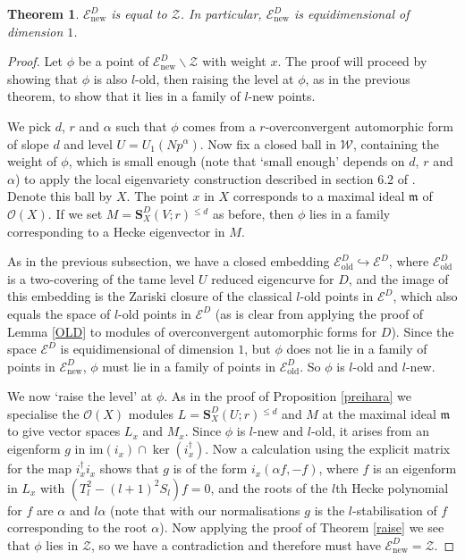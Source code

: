 \documentclass[a4paper, notitlepage]{amsart}
\newcommand{\m}{\ensuremath{\mathfrak{m}}\xspace}
\newcommand{\OO}{\ensuremath{\mathscr{O}}\xspace}
\newtheorem{theorem}{Theorem}
\newcommand{\OC}{\ensuremath{\mathbf{S}^D_{X}(U;r)}\xspace}
\newcommand{\OCV}{\ensuremath{\mathbf{S}^D_{X}(V;r)}\xspace}
\newcommand{\s}{\ensuremath{^{\leq d}}\xspace}
\begin{document}
\begin{theorem}\label{thm:neweigen}
$\mathscr{E}^D_{\mathrm{new}}$ is equal to $\mathscr{Z}$. In particular, $\mathscr{E}^D_{\mathrm{new}}$ is equidimensional of dimension $1$.
\end{theorem}
\begin{proof}
Let $\phi$ be a point of $\mathscr{E}^D_{\mathrm{new}}\backslash \mathscr{Z}$ with weight $x$. The proof will proceed by showing that $\phi$ is also $l$-old, then raising the level at $\phi$, as in the previous theorem, to show that it lies in a family of $l$-new points.

We pick $d$, $r$ and $\alpha$ such that $\phi$ comes from a $r$-overconvergent automorphic form of slope $d$ and level $U=U_1(Np^\alpha)$. Now fix a closed ball in $\mathscr{W}$, containing the weight of $\phi$, which is small enough (note that `small enough' depends on $d$, $r$ and $\alpha$) to apply the local eigenvariety construction described in section 6.2 of \cite{Chenun}. Denote this ball by $X$. The point $x$ in $X$ corresponds to a maximal ideal $\m$ of $\OO(X)$. If we set $M=\OCV\s$ as before, then $\phi$ lies in a family corresponding to a Hecke eigenvector in $M$.

As in the previous subsection, we have a closed embedding $\mathscr{E}^D_{\mathrm{old}}\hookrightarrow \mathscr{E}^D$, where $\mathscr{E}^D_{\mathrm{old}}$ is a two-covering of the tame level $U$ reduced eigencurve for $D$, and the image of this embedding is the Zariski closure of the classical $l$-old points in $\mathscr{E}^D$, which also equals the space of $l$-old points in $\mathscr{E}^D$ (as is clear from applying the proof of Lemma \ref{OLD} to modules of overconvergent automorphic forms for $D$). Since the space $\mathscr{E}^D$ is equidimensional of dimension $1$, but $\phi$ does not lie in a family of points in $\mathscr{E}^D_{\mathrm{new}}$, $\phi$ must lie in a family of points in $\mathscr{E}^D_{\mathrm{old}}$. So $\phi$ is $l$-old and $l$-new.

We now `raise the level' at $\phi$. As in the proof of Proposition \ref{preihara} we specialise the $\OO(X)$ modules $L=\OC\s$ and $M$ at the maximal ideal $\m$ to give vector spaces $L_x$ and $M_x$. Since $\phi$ is $l$-new and $l$-old, it arises from an eigenform $g$ in $\mathrm{im}(i_x)\cap \ker (i^\dagger_x)$. Now a calculation using the explicit matrix for the map $i^\dagger_x i_x$ shows that $g$ is of the form $i_x(\alpha f,-f)$, where $f$ is an eigenform in $L_x$ with $(T_l^2-(l+1)^2S_l)f=0$, and the roots of the $l$th Hecke polynomial for $f$ are $\alpha$ and $l\alpha$ (note that with our normalisations $g$ is the $l$-stabilisation of $f$ corresponding to the root $\alpha$). Now applying the proof of Theorem \ref{raise} we see that $\phi$ lies in $\mathscr{Z}$, so we have a contradiction and therefore must have $\mathscr{E}^D_{\mathrm{new}}=\mathscr{Z}$.
\end{proof}
\end{document}
